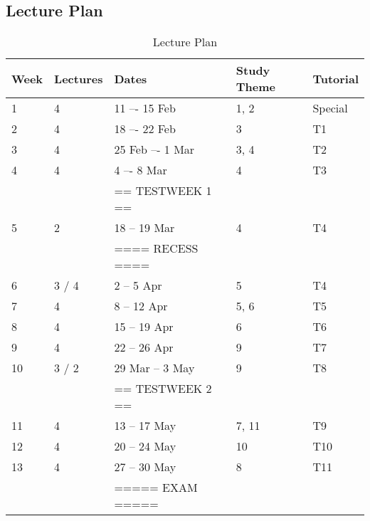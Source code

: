     \subsection{Lecture Plan}
        \begin{table}[!h]
            \begin{center}
             \begin{tabular}{|l|l|l|l|l|}
                 \hline
                 {\bf Week} & {\bf Lectures} & {\bf Dates} & {\bf Study Theme} & {\bf Tutorial} \\
                 \hline
                 1  & 4     & 11 –- 15 Feb     & 1, 2  & Special \\
                 2  & 4     & 18 –- 22 Feb     & 3     & T1 \\
                 3  & 4     & 25 Feb –- 1 Mar  & 3, 4  & T2 \\
                 4  & 4     & 4 –- 8 Mar       & 4     & T3 \\
                    &       & == TESTWEEK 1 == &       & \\
                 5  & 2     & 18 -- 19 Mar     & 4     & T4 \\
                    &       & ==== RECESS ==== &       & \\
                 6  & 3 / 4 & 2 -- 5 Apr       & 5     & T4 \\
                 7  & 4     & 8 -- 12 Apr      & 5, 6  & T5 \\
                 8  & 4     & 15 -- 19 Apr     & 6     & T6 \\
                 9  & 4     & 22 -- 26 Apr     & 9     & T7 \\
                 10 & 3 / 2 & 29 Mar -- 3 May  & 9     & T8 \\
                    &       & == TESTWEEK 2 == &       & \\
                 11 & 4     & 13 -- 17 May     & 7, 11 & T9 \\
                 12 & 4     & 20 -- 24 May     & 10    & T10 \\
                 13 & 4     & 27 -- 30 May     & 8     & T11 \\
                    &       & ===== EXAM ===== &       & \\
                 \hline
             \end{tabular}
             \caption{Lecture Plan}
            \end{center}
        \end{table}
        
